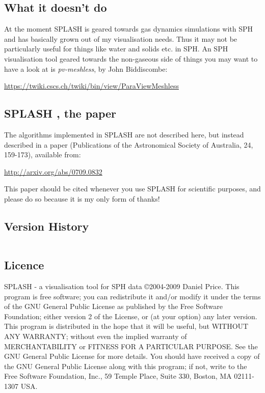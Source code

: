 \documentclass[a4paper,10pt]{article}
\def\thisyear{2009 }
\newcommand{\splash}{\textsc{SPLASH }}
\begin{document}
\subsection{What it doesn't do}
At the moment \splash is geared towards gas dynamics simulations with SPH and has basically grown out of my visualisation needs.
Thus it may not be particularly useful for things like water and solids etc. in SPH. An SPH visualisation tool geared towards the non-gaseous side of things you may want to have a look at is {\it pv-meshless}, by John Biddiscombe:

\url{https://twiki.cscs.ch/twiki/bin/view/ParaViewMeshless}

\subsection{\splash, the paper}
 The algorithms implemented in \splash are not described here, but instead described in a paper \citep{splashpaper} (Publications of the Astronomical Society of Australia, 24, 159-173), available from:

\url{http://arxiv.org/abs/0709.0832}

\noindent This paper should be cited whenever you use \splash for scientific purposes, and please do so because it is my only form of thanks!

\subsection{Version History}

\begin{longtable}{|l|l|p{}|}
\hline

\hline
\end{longtable}

\subsection{Licence}
\splash - a visualisation tool for SPH data \copyright 2004-\thisyear  Daniel Price.
 This program is free software; you can redistribute it and/or modify it under the terms of the GNU General Public License as published by the Free Software Foundation; either version 2 of the License, or (at your option) any later version. This program is distributed in the hope that it will be useful, but WITHOUT ANY WARRANTY; without even the implied warranty of MERCHANTABILITY or FITNESS FOR A PARTICULAR PURPOSE.  See the GNU General Public License for more details. You should have received a copy of the GNU General Public License along with this program; if not, write to the Free Software Foundation, Inc., 59 Temple Place, Suite 330, Boston, MA  02111-1307  USA.
\end{document}
